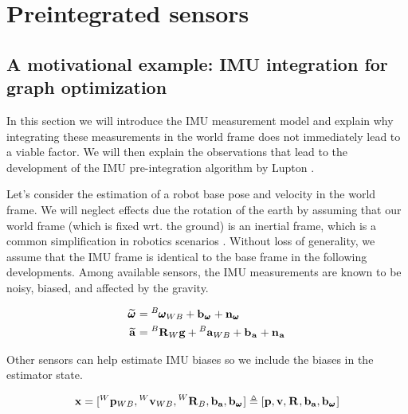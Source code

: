 \chapter{Preintegrated sensors}
\minitoc

\label{chp:preintegrated}

  
\section{A motivational example: IMU integration for graph optimization}
In this section we will introduce the IMU measurement model and explain why integrating these measurements in the world frame does not immediately
lead to a viable factor. We will then explain the observations that lead to the development of the IMU pre-integration algorithm by Lupton \cite{lupton-09}.

Let's consider the estimation of a robot base pose and velocity in the world frame. We will neglect effects due the rotation of the earth by assuming 
that our world frame (which is fixed wrt. the ground) is an inertial frame, which
is a common simplification in robotics scenarios \cite{forster2017-TRO}. Without loss of generality, we assume that the IMU frame is identical to the base frame 
in the following developments. Among available sensors, the IMU measurements are known to be noisy, biased, and affected by the gravity.

\begin{equation}
    \begin{split}
    \prescript{}{}{\widetilde{\pmb{\omega}}}_{} &= \prescript{B}{}{\pmb{\omega}}_{WB} + {\bf b}_{\prescript{}{}{\pmb{\omega}}_{}} + {\bf n}_{\prescript{}{}{\pmb{\omega}}_{}} 
    \\
    \prescript{}{}{\widetilde{{\bf a}}}_{}    &= \prescript{B}{}{{\bf R}}_{W} {\bf g} + \prescript{B}{}{{\bf a}}_{WB} + {\bf b}_{\prescript{}{}{{\bf a}}_{}} + {\bf n}_{\prescript{}{}{{\bf a}}_{}} 
    \end{split}
    \label{eq:imu_meas_model}
\end{equation}
    
Other sensors can help estimate IMU biases so we include the biases in the estimator state.

\begin{equation}
    {\bf x} = [\prescript{W}{}{{\bf p}}_{WB}, \prescript{W}{}{{\bf v}}_{WB}, \prescript{W}{}{{\bf R}}_{B}, {\bf b}_{{\bf a}}, {\bf b}_{\prescript{}{}{\pmb{\omega}}_{}}]
    \triangleq 
    [{\bf p}, {\bf v}, \prescript{}{}{{\bf R}}_{}, {\bf b}_{{\bf a}}, {\bf b}_{\prescript{}{}{\pmb{\omega}}_{}}] 
\end{equation}

